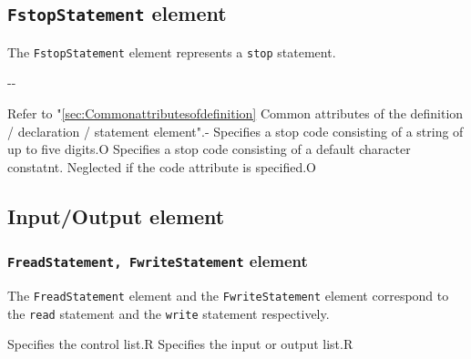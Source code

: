 \subsection{ {\tt FstopStatement} element}

The {\tt FstopStatement} element represents a {\tt stop} statement.


\begin{XcodeMLChildElements}
\XcodeMLElementDef{-}
{-}{-}
\end{XcodeMLChildElements}

\begin{XcodeMLAttributes}
{Refer to "\ref{sec:Commonattributesofdefinition} Common attributes of the definition / declaration / statement element".}{-}
{Specifies a stop code consisting of a string of up to five digits.}{O}
{Specifies a stop code consisting of a default character constatnt.
 Neglected if the code attribute is specified.}{O}
\end{XcodeMLAttributes}


\subsection{Input/Output element}

\subsubsection{ {\tt FreadStatement, FwriteStatement} element}

The {\tt FreadStatement} element and the {\tt FwriteStatement} element correspond to the {\tt read} statement and the {\tt write} statement respectively.


\begin{XcodeMLChildElements}
{Specifies the control list.}{R}
{Specifies the input or output list.}{R}
\end{XcodeMLChildElements}

